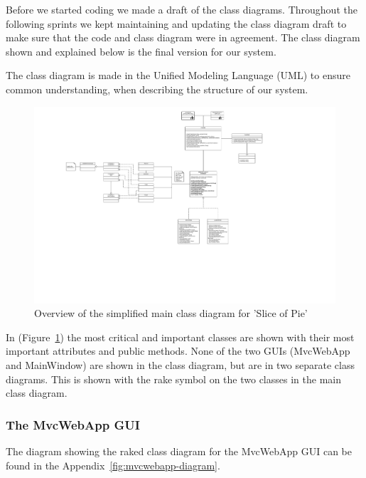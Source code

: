 Before we started coding we made a draft of the class diagrams. Throughout the following sprints we kept maintaining and updating the class diagram
draft to make sure that the code and class diagram were in agreement. The class diagram shown and explained below is the final version for our
system.

The class diagram is made in the Unified Modeling Language (UML) to ensure common understanding, when describing the structure of our system.

\begin{figure}[htb]
    \begin{center}
        \includegraphics[width=1\textwidth]{Software_design/graphics/mainClassDiagram.png}
        \caption{Overview of the simplified main class diagram for 'Slice of Pie'}
        \label{fig:design-class_diagram}
    \end{center}
\end{figure}

In (Figure~\ref{fig:design-class_diagram}) the most critical and important classes are shown with their most important attributes and public methods.
None of the two GUIs (MvcWebApp and MainWindow) are shown in the class diagram, but are in two separate class diagrams. This is shown with the rake
symbol on the two classes in the main class diagram.


\subsubsection{The MvcWebApp GUI}

The diagram showing the raked class diagram for the MvcWebApp GUI can be found in the Appendix~\ref{fig:mvcwebapp-diagram}.

